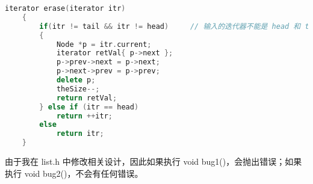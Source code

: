 \documentclass[UTF8]{ctexart}
\begin{document}
\begin{lstlisting}[language=c++, breaklines=true, keywordstyle=\color{blue!70}, commentstyle=\color{red!50!green!50!blue!50}, frame=shadowbox, rulesepcolor=\color{red!20!green!20!blue!20}]
    iterator erase(iterator itr)
    {
        if(itr != tail && itr != head)     // 输入的迭代器不能是 head 和 tail
        {
            Node *p = itr.current;
            iterator retVal{ p->next };
            p->prev->next = p->next;
            p->next->prev = p->prev;
            delete p;
            theSize--;
            return retVal;
        } else if (itr == head)
            return ++itr;
        else
            return itr;
    }
\end{lstlisting}

由于我在 list.h 中修改相关设计，因此如果执行 void bug1()，会抛出错误；如果执行 void bug2()，不会有任何错误。
\end{document}
